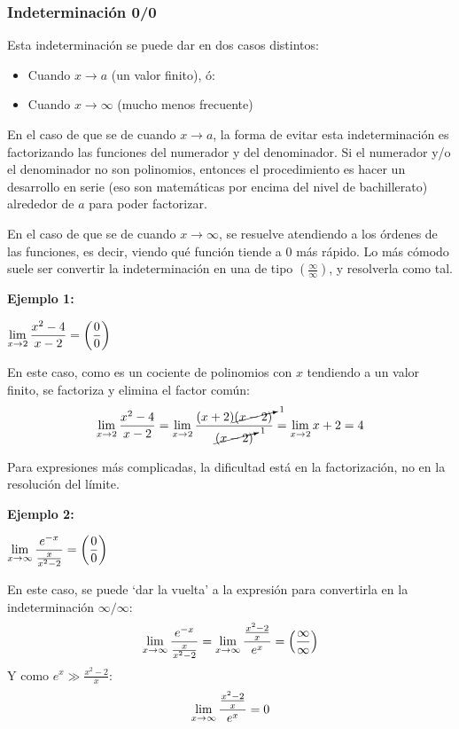 \documentclass[sans]{apuntes}
\begin{document}
\subsubsection{Indeterminación 0/0}
Esta indeterminación se puede dar en dos casos distintos:
\begin{itemize}
	\item Cuando $x \to a$ (un valor finito), ó:
	\item Cuando $x \to \infty$ (mucho menos frecuente)
\end{itemize}
En el caso de que se de cuando $x \to a$, la forma de evitar esta indeterminación es factorizando las funciones del numerador y del denominador. Si el numerador y/o el denominador no son polinomios, entonces el procedimiento es hacer un desarrollo en serie (eso son matemáticas por encima del nivel de bachillerato) alrededor de $a$ para poder factorizar.
\par En el caso de que se de cuando $x \to \infty$, se resuelve atendiendo a los órdenes de las funciones, es decir, viendo qué función tiende a 0 más rápido. Lo más cómodo suele ser convertir la indeterminación en una de tipo \(\left(\frac{\infty}{\infty}\right)\), y resolverla como tal.

\begin{examplebox}
	\textbf{Ejemplo 1:}
	\par \(\displaystyle\lim_{x\to 2}\frac{x^2 - 4}{x - 2} = \left(\frac{0}{0}\right)\)
	\par En este caso, como es un cociente de polinomios con $x$ tendiendo a un valor finito, se factoriza y elimina el factor común:
	\[\displaystyle\lim_{x \to 2}\frac{x^2 - 4}{x - 2} = \displaystyle\lim_{x \to 2}\frac{(x + 2)\cancelto{1}{(x - 2)}}{\cancelto{1}{(x - 2)}} = \displaystyle\lim_{x \to 2} x + 2 = 4\]

	Para expresiones más complicadas, la dificultad está en la factorización, no en la resolución del límite.

	\vspace{2em}
	\textbf{Ejemplo 2:}
	\par \(\displaystyle\lim_{x\to \infty}\frac{e^{-x}}{\frac{x}{x^2 - 2}} = \left(\frac{0}{0}\right)\)
	\par En este caso, se puede `dar la vuelta' a la expresión para convertirla en la indeterminación $\infty/\infty$:
	\[\displaystyle\lim_{x\to \infty}\frac{e^{-x}}{\frac{x}{x^2 - 2}} = \displaystyle\lim_{x\to \infty}\frac{\frac{x^2-2}{x}}{e^x} = \left(\frac{\infty}{\infty}\right)\]
	Y como $e^x \gg \frac{x^2 - 2}{x}$:
	\[\displaystyle\lim_{x\to \infty}\frac{\frac{x^2-2}{x}}{e^x} = 0\]
\end{examplebox}
\end{document}
